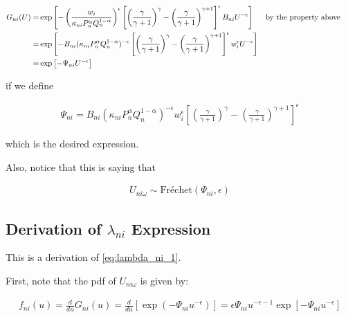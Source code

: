 \documentclass[10pt]{article}
\begin{document}
\begin{align}
    G_{n i}(U)=&\exp \left[-\left(\frac{w_i}{\kappa_{n i} P_n^\alpha Q_n^{1-\alpha}}\right)^{\epsilon} \left[\left(\frac{\gamma}{\gamma+1}\right)^\gamma-\left(\frac{\gamma}{\gamma+1}\right)^{\gamma+1}\right]^\epsilon B_{n i} U^{-\epsilon}\right] && \parbox[t]{4cm}{\raggedright by the property above} \\
    =&\exp \left[-B_{ni} (\kappa_{n i} P_n^\alpha Q_n^{1-\alpha})^{-\epsilon} \left[\left(\frac{\gamma}{\gamma+1}\right)^\gamma-\left(\frac{\gamma}{\gamma+1}\right)^{\gamma+1}\right]^\epsilon w_i^\epsilon U^{-\epsilon}\right] \\
    =&\exp \left[- \Psi_{n i} U^{-\epsilon}\right]
\end{align}

if we define

\begin{align}
    \Psi_{n i}=B_{n i}\left(\kappa_{n i} P_n^\alpha Q_n^{1-\alpha}\right)^{-\epsilon} w_i^\epsilon \left[\left(\frac{\gamma}{\gamma+1}\right)^\gamma-\left(\frac{\gamma}{\gamma+1}\right)^{\gamma+1}\right]^\epsilon
\end{align}

which is the desired expression.

Also, notice that this is saying that

\begin{align}
    U_{n i \omega} \sim \text{Fréchet}\left(\Psi_{n i}, \epsilon\right) \label{eq:frechet_indirect_utility_sim}
\end{align}


\subsection{Derivation of $\lambda_{n i}$ Expression}
\label{sec:lambda_ni_1}

This is a derivation of \eqref{eq:lambda_ni_1}.

First, note that the pdf of $U_{n i \omega}$ is given by:

\begin{align}
    f_{n i}(u)=\frac{d}{d u} G_{n i}(u)= \frac{d}{d u}\left[\exp \left(-\Psi_{n i} u^{-\epsilon}\right)\right]
    =\epsilon \Psi_{n i} u^{-\epsilon-1} \exp \left[-\Psi_{n i} u^{-\epsilon}\right] \label{eq:pdf_frechet}
\end{align}
\end{document}
